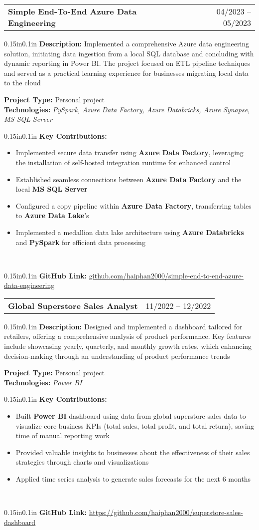 \documentclass[a4paper,12pt]{article}
\makeatletter
\newcommand{\resumeItem}[1]{
  \item\small{
    {#1 \vspace{-2pt}}
  }
}
\newcommand{\resumeProjectHeading}[7]{
    \item
    \begin{tabular*}{0.97\textwidth}{l@{\extracolsep{\fill}}r}
        \normalsize #1 & \small #2 \\
    \end{tabular*} \vspace{-3pt} \small 
    \begin{adjustwidth}{0.15in}{0.1in} 
        \textbf{Description: }{#3}\\
    \end{adjustwidth} \vspace{-4pt}
    \hspace{0.15in}\textbf{Project Type: }{#4}\\
    \hspace{0.15in}\textbf{Technologies: }{\textit{#5}}\\ \vspace{-3pt}
    \begin{adjustwidth}{0.15in}{0.1in} 
        \textbf{Key Contributions: }{#6}\\
    \end{adjustwidth} \vspace{-9pt}
    \begin{adjustwidth}{0.15in}{0.1in}  
        \textbf{GitHub Link: }\href{#7}{\uline{{#7}}}
    \end{adjustwidth}
}
\newcommand{\resumeItemListStart}{\vspace{-7pt} \begin{itemize}[label={\normalsize\textbullet}]}
\newcommand{\resumeItemListEnd}{\end{itemize} \vspace{1pt}}
\makeatother
\begin{document}
        \resumeProjectHeading
            {\textbf{Simple End-To-End Azure Data Engineering}}{04/2023 – 05/2023}
            {Implemented a comprehensive Azure data engineering solution, initiating data ingestion from a local SQL database and concluding with dynamic reporting in Power BI. The project focused on ETL pipeline techniques and served as a practical learning experience for businesses migrating local data to the cloud}
            {Personal project}
            {PySpark, Azure Data Factory, Azure Databricks, Azure Synapse, MS SQL Server}
            {\resumeItemListStart
                \resumeItem{Implemented secure data transfer using \textbf{Azure Data Factory}, leveraging the installation of self-hosted integration runtime for enhanced control}
                \resumeItem{Established seamless connections between \textbf{Azure Data Factory} and the local \textbf{MS SQL Server}}
                \resumeItem{Configured a copy pipeline within \textbf{Azure Data Factory}, transferring tables to \textbf{Azure Data Lake}'s}
                \resumeItem{Implemented a medallion data lake architecture using \textbf{Azure Databricks} and \textbf{PySpark} for efficient data processing}
          \resumeItemListEnd}
          {github.com/haiphan2000/simple-end-to-end-azure-data-engineering}
    
        \resumeProjectHeading
            {\textbf{Global Superstore Sales Analyst}}{11/2022 – 12/2022}
            {Designed and implemented a dashboard tailored for retailers, offering a comprehensive analysis of product performance. Key features include showcasing yearly, quarterly, and monthly growth rates, which enhancing decision-making through an understanding of product performance trends}
            {Personal project}
            {Power BI}
            {\resumeItemListStart
                \resumeItem{Built \textbf{Power BI} dashboard using data from global superstore sales data to visualize core business KPIs (total sales, total profit, and total return), saving time of manual reporting work}
                \resumeItem{Provided valuable insights to businesses about the effectiveness of their sales strategies through charts and visualizations}
                \resumeItem{Applied time series analysis to generate sales forecasts for the next 6 months}
            \resumeItemListEnd}
            {https://github.com/haiphan2000/superstore-sales-dashboard}
        
\end{document}
